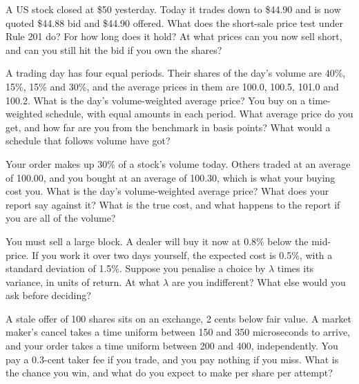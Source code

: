 \begin{question}\label{iq:iv2:markets-and-microstructure:22}
A US stock closed at \$50 yesterday. Today it trades down to \$44.90 and is now quoted \$44.88 bid and \$44.90 offered. What does the short-sale price test under Rule 201 do? For how long does it hold? At what prices can you now sell short, and can you still hit the bid if you own the shares?
\end{question}

\begin{question}\label{iq:iv2:markets-and-microstructure:23}
A trading day has four equal periods. Their shares of the day's volume are 40\%, 15\%, 15\% and 30\%, and the average prices in them are 100.0, 100.5, 101.0 and 100.2. What is the day's volume-weighted average price? You buy on a time-weighted schedule, with equal amounts in each period. What average price do you get, and how far are you from the benchmark in basis points? What would a schedule that follows volume have got?
\end{question}

\begin{question}\label{iq:iv2:markets-and-microstructure:24}
Your order makes up 30\% of a stock's volume today. Others traded at an average of 100.00, and you bought at an average of 100.30, which is what your buying cost you. What is the day's volume-weighted average price? What does your report say against it? What is the true cost, and what happens to the report if you are all of the volume?
\end{question}

\begin{question}\label{iq:iv2:markets-and-microstructure:25}
You must sell a large block. A dealer will buy it now at 0.8\% below the mid-price. If you work it over two days yourself, the expected cost is 0.5\%, with a standard deviation of 1.5\%. Suppose you penalise a choice by $\lambda$ times its variance, in units of return. At what $\lambda$ are you indifferent? What else would you ask before deciding?
\end{question}

\begin{question}\label{iq:iv2:markets-and-microstructure:26}
A stale offer of 100 shares sits on an exchange, 2 cents below fair value. A market maker's cancel takes a time uniform between 150 and 350 microseconds to arrive, and your order takes a time uniform between 200 and 400, independently. You pay a 0.3-cent taker fee if you trade, and you pay nothing if you miss. What is the chance you win, and what do you expect to make per share per attempt?
\end{question}

